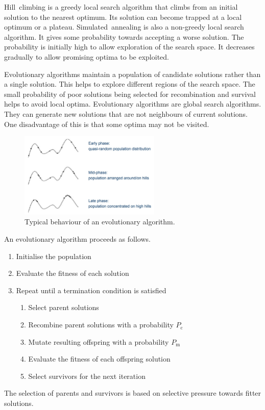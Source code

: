 Hill~climbing is a greedy local search algorithm that climbs from an initial solution to the nearest optimum.
Its solution can become trapped at a local optimum or a plateau.
Simulated~annealing is also a non-greedy local search algorithm.
It gives some probability towards accepting a worse solution.
The probability is initially high to allow exploration of the search space.
It decreases gradually to allow promising optima to be exploited.

Evolutionary algorithms maintain a population of candidate solutions rather than a single solution.
This helps to explore different regions of the search space.
The small probability of poor solutions being selected for recombination and survival helps to avoid local optima.
Evolutionary algorithms are global search algorithms.
They can generate new solutions that are not neighbours of current solutions.
One disadvantage of this is that some optima may not be visited.

\begin{figure}[!htp]
  \centering
  \caption*{Typical behaviour of an evolutionary algorithm.}
  \includegraphics[width=0.6\textwidth]{unit-11/figures/phases.jpg}
\end{figure}

An evolutionary algorithm proceeds as follows.
\begin{enumerate}
  \item Initialise the population
  \item Evaluate the fitness of each solution
  \item Repeat until a termination condition is satisfied
  \begin{enumerate}
    \item Select parent solutions
    \item Recombine parent solutions with a probability \( P_{\mathrm{c}} \)
    \item Mutate resulting offspring with a probability \( P_{\mathrm{m}} \)
    \item Evaluate the fitness of each offspring solution
    \item Select survivors for the next iteration
  \end{enumerate}
\end{enumerate}
The selection of parents and survivors is based on selective pressure towards fitter solutions.

